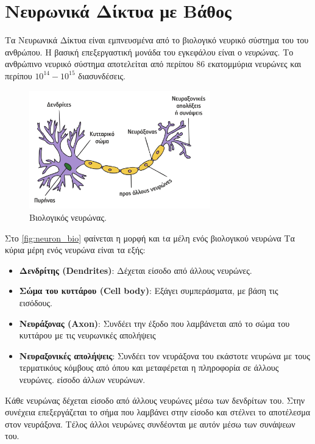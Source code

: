 \section{Νευρωνικά Δίκτυα με Βάθος}
\label{sec:theory_dnn}

Τα Νευρωνικά Δίκτυα είναι εμπνευσμένα από το βιολογικό νευρικό σύστημα του
του ανθρώπου. Η βασική επεξεργαστική μονάδα του εγκεφάλου είναι ο \emph{νευρώνας}.
Το ανθρώπινο νευρικό σύστημα αποτελείται από περίπου 86 εκατομμύρια νευρώνες και περίπου
$10^14 - 10^15$ διασυνδέσεις.
\begin{figure}[!ht]
  \centering
  \includegraphics[width=0.7\textwidth]{./images/chapter3/neuron.png}
  \caption[Βιολογικός Νευρώνας]{Βιολογικός νευρώνας.}
  \label{fig:neuron_bio}
\end{figure}
Στο \autoref{fig:neuron_bio} φαίνεται η μορφή και tα μέλη ενός βιολογικού νευρώνα
Τα κύρια μέρη ενός νευρώνα είναι τα εξής:
\begin{itemize}
  \item{\textbf{Δενδρίτης (Dendrites)}: Δέχεται είσοδο από άλλους νευρώνες.}
  \item{\textbf{Σώμα του κυττάρου (Cell body)}: Εξάγει συμπεράσματα, με βάση τις εισόδους.}
  \item{\textbf{Νευράξονας (Axon)}: Συνδέει την έξοδο που λαμβάνεται από το σώμα του κυττάρου με τις νευρωνικές απολήψεις}
  \item{\textbf{Νευραξονικές απολήψεις}: Συνδέει τον νευράξονα του εκάστοτε νευρώνα με τους τερματικόυς κόμβους
    από όπου και μεταφέρεται η πληροφορία σε άλλους νευρώνες.
    είσοδο άλλων νευρώνων.}
\end{itemize}
Κάθε νευρώνας δέχεται είσοδο από άλλους νευρώνες μέσω των δενδρίτων του.
Στην συνέχεια επεξεργάζεται το σήμα που λαμβάνει στην είσοδο και
στέλνει το αποτέλεσμα στον νευράξονα. Τέλος άλλοι νευρώνες συνδέονται με αυτόν
μέσω των συνάψεων του.

